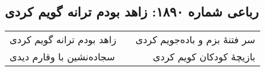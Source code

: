 \begin{center}
\section*{رباعی شماره ۱۸۹۰: زاهد بودم ترانه گویم کردی}
\label{sec:1890}
\begin{longtable}{l p{0.5cm} r}
زاهد بودم ترانه گویم کردی
&&
سر فتنهٔ بزم و باده‌جویم کردی
\\
سجاده‌نشین با وقارم دیدی
&&
بازیچهٔ کودکان کویم کردی
\\
\end{longtable}
\end{center}
